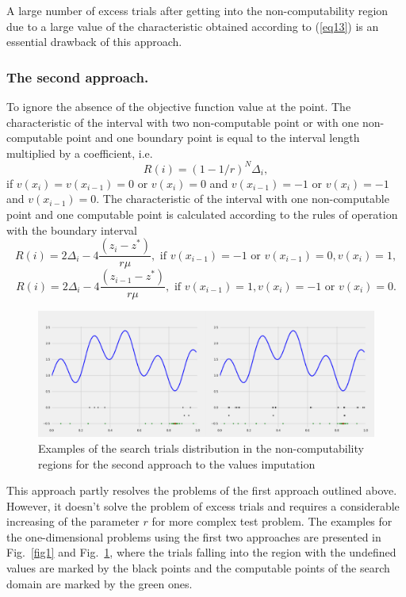 \documentclass[runningheads]{llncs}
\begin{document}
A large number of excess trials after getting into the non-computability region due to a large value of the characteristic obtained according to (\ref{eq13}) is an essential drawback of this approach.

\subsubsection{The second approach.} To ignore the absence of the objective function value at the point. The characteristic of the interval with two non-computable point or with one non-computable point and one boundary point is equal to the interval length multiplied by a coefficient, i.e.
\begin{equation}\label{eq14} 
R(i)={(1-{1}/{r})}^N \Delta _i,
\end{equation}
if $v(x_i)=v(x_{i-1})=0$ or $v(x_i)=0$ and $v(x_{i-1})=-1$ or $v(x_i)=-1$ and $v(x_{i-1})=0$.
The characteristic of the interval with one non-computable point and one computable point is calculated according to the rules of operation with the boundary interval
\begin{equation}\label{eq15} 
R(i)=2\Delta _i-4 \frac {(z_i-z^*)}{r \mu},\text{ if } v(x_{i-1})=-1  \text{ or } v(x_{i-1})=0, v(x_i)=1,
\end{equation}
\begin{equation}\label{eq16} 
R(i)=2\Delta _i-4 \frac {(z_{i-1}-z^*)}{r \mu},\text{ if } v(x_{i-1})=1, v(x_i)=-1 \text{ or } v(x_i)=0.
\end{equation}

\begin{figure}
\includegraphics[width=\textwidth]{fig2.png}
\caption{Examples of the search trials distribution in the non-computability regions for the second approach to the values imputation} \label{fig2}
\end{figure}

This approach partly resolves the problems of the first approach outlined above. However, it doesn't solve the problem of excess trials and requires a considerable increasing of the parameter $r$ for more complex test problem. The examples for the one-dimensional problems using the first two approaches are presented in Fig.~\ref{fig1} and Fig.~\ref{fig2}, where the trials falling into the region with the undefined values are marked by the black points and the computable points of the search domain are marked by the green ones. 
\end{document}
